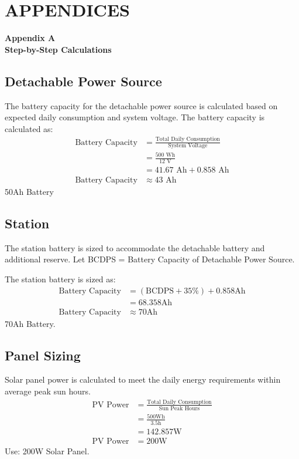 \chapter*{APPENDICES}

\appendix

{\centering
	\textbf{Appendix A\\Step-by-Step Calculations}\par
}

\section*{Detachable Power Source}
The battery capacity for the detachable power source is calculated based on expected daily consumption and system voltage.  
The battery capacity is calculated as:
\begin{align*}
	\text{Battery Capacity} &= \frac{\text{Total Daily Consumption}}{\text{System Voltage}} \\ 
	&= \frac{500 \text{ Wh}}{12 \text{ V}} \\ 
	&= 41.67 \text{ Ah} + 0.858 \text{ Ah} \\ 
	\text{Battery Capacity} &\approx 43 \text{ Ah}
\end{align*}
 50Ah  Battery

\section*{Station}
The station battery is sized to accommodate the detachable battery and additional reserve.  
Let BCDPS = Battery Capacity of Detachable Power Source. 

The station battery is sized as:
\begin{align*} 
	\text{Battery Capacity} &= (\text{BCDPS} + 35\%) + 0.858\text{Ah} \\
	&= 68.358\text{Ah} \\
	\text{Battery Capacity} &\approx 70 \text{Ah}
\end{align*}
 70Ah  Battery.

\section*{Panel Sizing}
Solar panel power is calculated to meet the daily energy requirements within average peak sun hours.  
\begin{align*}
	\text{PV Power} &= \frac{\text{Total Daily Consumption}}{\text{Sun Peak Hours}} \\
	&= \frac{500\text{Wh}}{3.5\text{h}} \\
	&= 142.857\text{W} \\
	\text{PV Power} &= 200\text{W}
\end{align*}
Use: 200W Solar Panel.


